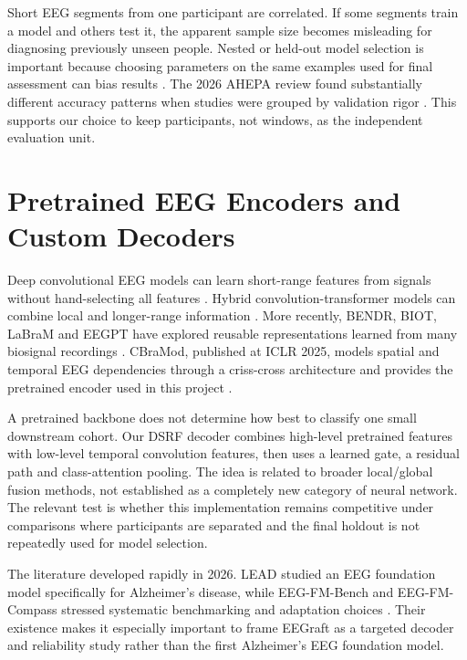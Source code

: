 Short EEG segments from one participant are correlated. If some segments train a model and others test it, the apparent sample size becomes misleading for diagnosing previously unseen people. Nested or held-out model selection is important because choosing parameters on the same examples used for final assessment can bias results \cite{varma2006,varoquaux2018}. The 2026 AHEPA review found substantially different accuracy patterns when studies were grouped by validation rigor \cite{miltiadous2026benchmark}. This supports our choice to keep participants, not windows, as the independent evaluation unit.

\section{Pretrained EEG Encoders and Custom Decoders}
Deep convolutional EEG models can learn short-range features from signals without hand-selecting all features \cite{schirrmeister2017,lawhern2018}. Hybrid convolution-transformer models can combine local and longer-range information \cite{song2023,dice2023}. More recently, BENDR, BIOT, LaBraM and EEGPT have explored reusable representations learned from many biosignal recordings \cite{kostas2021,yang2023biot,jiang2024labram,wang2024eegpt}. CBraMod, published at ICLR 2025, models spatial and temporal EEG dependencies through a criss-cross architecture and provides the pretrained encoder used in this project \cite{wang2025cbramod}.

A pretrained backbone does not determine how best to classify one small downstream cohort. Our DSRF decoder combines high-level pretrained features with low-level temporal convolution features, then uses a learned gate, a residual path and class-attention pooling. The idea is related to broader local/global fusion methods, not established as a completely new category of neural network. The relevant test is whether this implementation remains competitive under comparisons where participants are separated and the final holdout is not repeatedly used for model selection.

The literature developed rapidly in 2026. LEAD studied an EEG foundation model specifically for Alzheimer's disease, while EEG-FM-Bench and EEG-FM-Compass stressed systematic benchmarking and adaptation choices \cite{wang2026lead,xiong2026,liu2026compass}. Their existence makes it especially important to frame EEGraft as a targeted decoder and reliability study rather than the first Alzheimer's EEG foundation model.

